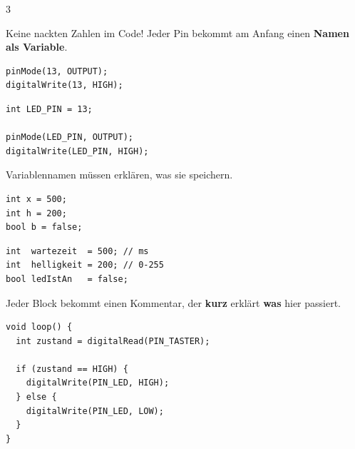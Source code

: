 \documentclass[a4paper,10pt,landscape]{article}
\begin{document}
\begin{multicols}{3}
\raggedcolumns



Keine nackten Zahlen im Code! Jeder Pin bekommt am Anfang einen \textbf{Namen als Variable}.

\begin{badbox}
\begin{lstlisting}
pinMode(13, OUTPUT);
digitalWrite(13, HIGH);
\end{lstlisting}
\end{badbox}

\begin{goodbox}
\begin{lstlisting}
int LED_PIN = 13;

pinMode(LED_PIN, OUTPUT);
digitalWrite(LED_PIN, HIGH);
\end{lstlisting}
\end{goodbox}


Variablennamen müssen erklären, was sie speichern.

\begin{badbox}
\begin{lstlisting}
int x = 500;
int h = 200;
bool b = false;
\end{lstlisting}
\end{badbox}

\begin{goodbox}
\begin{lstlisting}
int  wartezeit  = 500; // ms
int  helligkeit = 200; // 0-255
bool ledIstAn   = false;
\end{lstlisting}
\end{goodbox}

\columnbreak



Jeder Block bekommt einen Kommentar, der \textbf{kurz} erklärt \textbf{was} hier passiert.

\begin{badbox}
\begin{lstlisting}
void loop() {
  int zustand = digitalRead(PIN_TASTER);

  if (zustand == HIGH) {
    digitalWrite(PIN_LED, HIGH);
  } else {
    digitalWrite(PIN_LED, LOW);
  }
}
\end{lstlisting}
\end{badbox}


\end{multicols}
\end{document}
